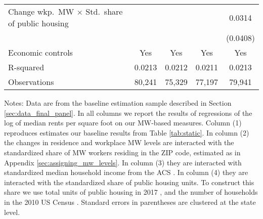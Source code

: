 \begin{table}[hbt!]
\begin{tabular}{@{}lcccc@{}}
        Change wkp.\ MW $\times$ Std.\ share of public housing &        &       &        &  0.0314   \\
                                                               &        &       &        & (0.0408)  \\ \midrule
        Economic controls                                      &  Yes   &  Yes  &   Yes  &  Yes   \\
        R-squared                                              &  0.0213   &  0.0212  &   0.0211  &  0.0213   \\
        Observations                                           &  80,241  &  75,329 &   77,197 &  79,941  \\ \bottomrule
    \end{tabular}

    \begin{minipage}{.95\linewidth} \footnotesize
        \vspace{2mm}
        Notes: 
        Data are from the baseline estimation sample described in Section 
        \ref{sec:data_final_panel}.
        In all columns we report the results of regressions of the log of median 
        rents per square foot on our MW-based measures.
        Column (1) reproduces estimates our baseline results from Table 
        \ref{tab:static}.
        In column (2) the changes in residence and workplace MW levels are 
        interacted with the standardized share of MW workers residing in 
        the ZIP code, estimated as in Appendix \ref{sec:assigning_mw_levels}.
        In column (3) they are interacted with standardized median household 
        income from the ACS \parencite{CensusACS}.
        In column (4) they are interacted with the standardized share of 
        public housing units.
        To construct this share we use total units of public housing in 2017 
        \parencite{hudHousing}, and the number of households in the 2010
        US Census \parencite{CensusDecennial}.
        Standard errors in parentheses are clustered at the state level.
    \end{minipage}
\end{table}
